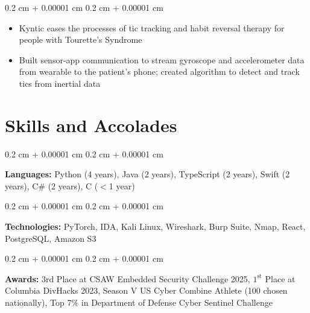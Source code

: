 \documentclass[10pt, letterpaper]{article}
\newenvironment{highlights}{ \begin{itemize}[ topsep=0.10 cm, parsep=0.10 cm, partopsep=0pt,
itemsep=0pt, leftmargin=0.4 cm + 10pt ] }{ \end{itemize} } %
\newenvironment{onecolentry}{ \begin{adjustwidth}{ 0.2 cm + 0.00001 cm }{ 0.2 cm + 0.00001 cm }
}{ \end{adjustwidth} } %
\begin{document}
	\vspace{0.10 cm}
	\begin{onecolentry}
		\begin{highlights}
			\item Kyntic eases the processes of tic tracking and habit reversal therapy
			for people with Tourette’s Syndrome \item Built sensor-app communication to
			stream gyroscope and accelerometer data from wearable to the patient’s phone;
			created algorithm to detect and track tics from inertial data
		\end{highlights}
	\end{onecolentry}

	\section{Skills and Accolades}

	\begin{onecolentry}
		\textbf{Languages:} Python (4 years), Java (2 years), TypeScript (2 years), Swift
		(2 years), C\# (2 years), C ($<$1 year)
	\end{onecolentry}

	\vspace{0.1 cm}

	\begin{onecolentry}
		\textbf{Technologies:} PyTorch, IDA, Kali Linux, Wireshark, Burp Suite, Nmap, React, PostgreSQL, Amazon S3
	\end{onecolentry}

	\vspace{0.1 cm}

	\begin{onecolentry}
		\textbf{Awards:} $3{\text{rd}}$ Place at CSAW Embedded Security Challenge 2025, $1^{\text{st}}$ Place at Columbia DivHacks 2023, Season V US Cyber Combine Athlete (100 chosen nationally), Top 7\% in Department of Defense Cyber Sentinel Challenge
	\end{onecolentry}
\end{document}
